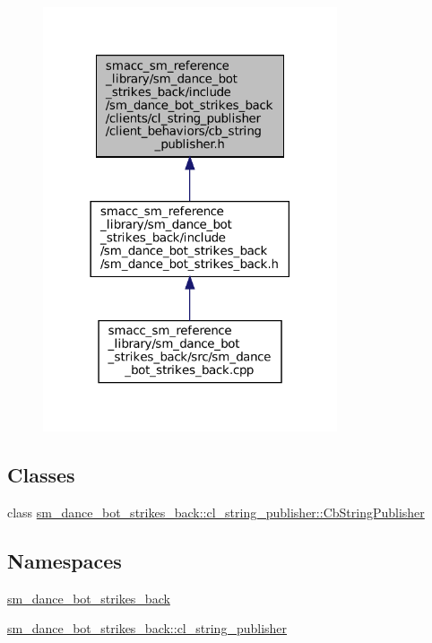 \begin{figure}[H]
\begin{center}
\leavevmode
\includegraphics[width=246pt]{sm__dance__bot__strikes__back_2include_2sm__dance__bot__strikes__back_2clients_2cl__string__publc5488a8306f3160a521010d9572d70ab}
\end{center}
\end{figure}
\subsection*{Classes}
\begin{DoxyCompactItemize}
\item 
class \hyperlink{classsm__dance__bot__strikes__back_1_1cl__string__publisher_1_1CbStringPublisher}{sm\+\_\+dance\+\_\+bot\+\_\+strikes\+\_\+back\+::cl\+\_\+string\+\_\+publisher\+::\+Cb\+String\+Publisher}
\end{DoxyCompactItemize}
\subsection*{Namespaces}
\begin{DoxyCompactItemize}
\item 
 \hyperlink{namespacesm__dance__bot__strikes__back}{sm\+\_\+dance\+\_\+bot\+\_\+strikes\+\_\+back}
\item 
 \hyperlink{namespacesm__dance__bot__strikes__back_1_1cl__string__publisher}{sm\+\_\+dance\+\_\+bot\+\_\+strikes\+\_\+back\+::cl\+\_\+string\+\_\+publisher}
\end{DoxyCompactItemize}
